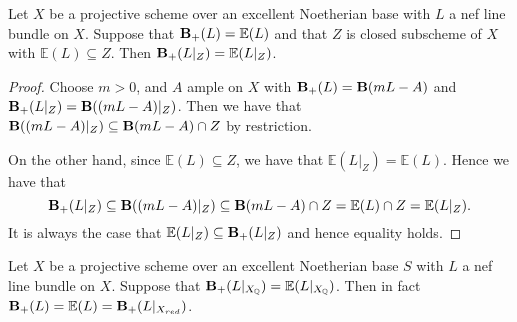 \begin{lemma}\label{red-eq}
	
	Let $X$ be a projective scheme over an excellent Noetherian base with $L$ a nef line bundle on $X$. Suppose that $\mathbf{B}_{+}(L)=\mathbb{E}(L)$ and that $Z$ is closed subscheme of $X$ with $\mathbb{E}(L) \subseteq Z$. Then $\mathbf{B}_{+}(L|_{Z})=\mathbb{E}(L|_{Z})$.
	
\end{lemma}

\begin{proof}
	
	Choose $m> 0$, and $A$ ample on $X$ with $\mathbf{B}_{+}(L)=\mathbf{B}(mL-A)$ and $\mathbf{B}_{+}(L|_{Z})=\mathbf{B}((mL-A)|_{Z})$. Then we have that $\mathbf{B}((mL-A)|_{Z}) \subseteq \mathbf{B}(mL-A)\cap Z$ by restriction.
	
	On the other hand, since $\mathbb{E}(L) \subseteq Z$, we have that $\mathbb{E}(L|_{Z}) = \mathbb{E}(L)$. Hence we have that $$\mathbf{B}_{+}(L|_{Z})\subseteq \mathbf{B}((mL-A)|_{Z})\subseteq \mathbf{B}(mL-A)\cap Z =\mathbb{E}(L) \cap Z =\mathbb{E}(L|_{Z}).$$
	It is always the case that $\mathbb{E}(L|_{Z}) \subseteq \mathbf{B}_{+}(L|_{Z})$ and hence equality holds.
	
	
\end{proof}


\begin{theorem}\label{ext}
	
	Let $X$ be a projective scheme over an excellent Noetherian base $S$ with $L$ a nef line bundle on $X$. Suppose that $\mathbf{B}_{+}(L|_{X_{\mathbb{Q}}})=\mathbb{E}(L|_{X_{\mathbb{Q}}})$. Then in fact $\mathbf{B}_{+}(L)=\mathbb{E}(L)=\mathbf{B}_{+}(L|_{X_{red}})$.
	
\end{theorem}

